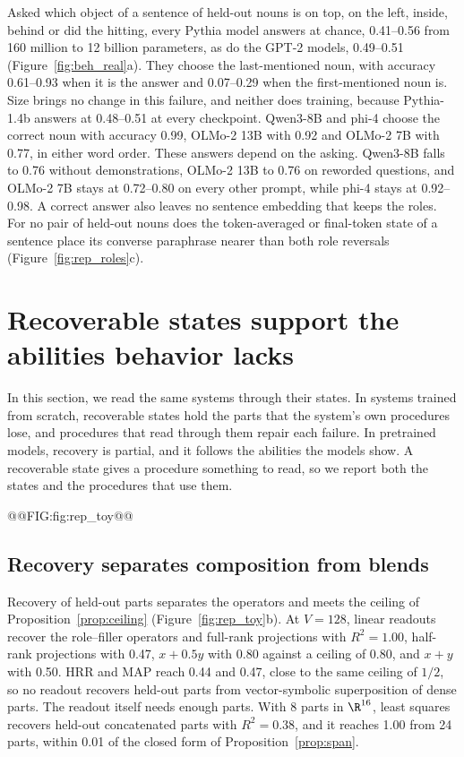 Asked which object of a sentence of held-out nouns is on top, on the left, inside, behind or did the hitting, every Pythia model answers at chance, 0.41--0.56 from 160 million to 12 billion parameters, as do the GPT-2 models, 0.49--0.51 (Figure~\ref{fig:beh_real}a). They choose the last-mentioned noun, with accuracy 0.61--0.93 when it is the answer and 0.07--0.29 when the first-mentioned noun is. Size brings no change in this failure, and neither does training, because Pythia-1.4b answers at 0.48--0.51 at every checkpoint. Qwen3-8B and phi-4 choose the correct noun with accuracy 0.99, OLMo-2 13B with 0.92 and OLMo-2 7B with 0.77, in either word order. These answers depend on the asking. Qwen3-8B falls to 0.76 without demonstrations, OLMo-2 13B to 0.76 on reworded questions, and OLMo-2 7B stays at 0.72--0.80 on every other prompt, while phi-4 stays at 0.92--0.98. A correct answer also leaves no sentence embedding that keeps the roles. For no pair of held-out nouns does the token-averaged or final-token state of a sentence place its converse paraphrase nearer than both role reversals (Figure~\ref{fig:rep_roles}c).

\section{Recoverable states support the abilities behavior lacks}
\label{sec:success}

In this section, we read the same systems through their states. In systems trained from scratch, recoverable states hold the parts that the system's own procedures lose, and procedures that read through them repair each failure. In pretrained models, recovery is partial, and it follows the abilities the models show. A recoverable state gives a procedure something to read, so we report both the states and the procedures that use them.

@@FIG:fig:rep_toy@@

\subsection{Recovery separates composition from blends}
\label{sec:calibration}

Recovery of held-out parts separates the operators and meets the ceiling of Proposition~\ref{prop:ceiling} (Figure~\ref{fig:rep_toy}b). At $V = 128$, linear readouts recover the role--filler operators and full-rank projections with $R^2 = 1.00$, half-rank projections with 0.47, $x + 0.5y$ with 0.80 against a ceiling of 0.80, and $x + y$ with 0.50. HRR and MAP reach 0.44 and 0.47, close to the same ceiling of $1/2$, so no readout recovers held-out parts from vector-symbolic superposition of dense parts. The readout itself needs enough parts. With 8 parts in $\R^{16}$, least squares recovers held-out concatenated parts with $R^2 = 0.38$, and it reaches 1.00 from 24 parts, within 0.01 of the closed form of Proposition~\ref{prop:span}.

